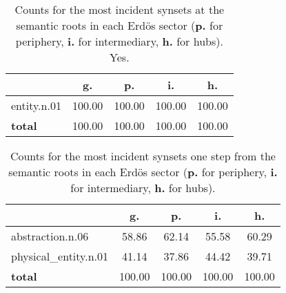 \begin{table}[h!]
\begin{center}
\begin{tabular}{| l || c | c | c | c |}\hline
 & {\bf g.} & {\bf p.} & {\bf i.} & {\bf h.} \\\hline\hline
entity.n.01 & 100.00  & 100.00  & 100.00  & 100.00 \\\hline\hline
{{\bf total}} & 100.00  & 100.00  & 100.00  & 100.00 \\\hline
\end{tabular}
\caption{Counts for the most incident synsets at the semantic roots in each Erd\"os sector ({\bf p.} for periphery, {\bf i.} for intermediary, {\bf h.} for hubs). Yes.}
\end{center}
\end{table}
\begin{table}[h!]
\begin{center}
\begin{tabular}{| l || c | c | c | c |}\hline
 & {\bf g.} & {\bf p.} & {\bf i.} & {\bf h.} \\\hline\hline
abstraction.n.06 & 58.86  & 62.14  & 55.58  & 60.29 \\\hline
physical\_entity.n.01 & 41.14  & 37.86  & 44.42  & 39.71 \\\hline\hline
{{\bf total}} & 100.00  & 100.00  & 100.00  & 100.00 \\\hline
\end{tabular}
\caption{Counts for the most incident synsets one step from the semantic roots in each Erd\"os sector ({\bf p.} for periphery, {\bf i.} for intermediary, {\bf h.} for hubs).}
\end{center}
\end{table}
